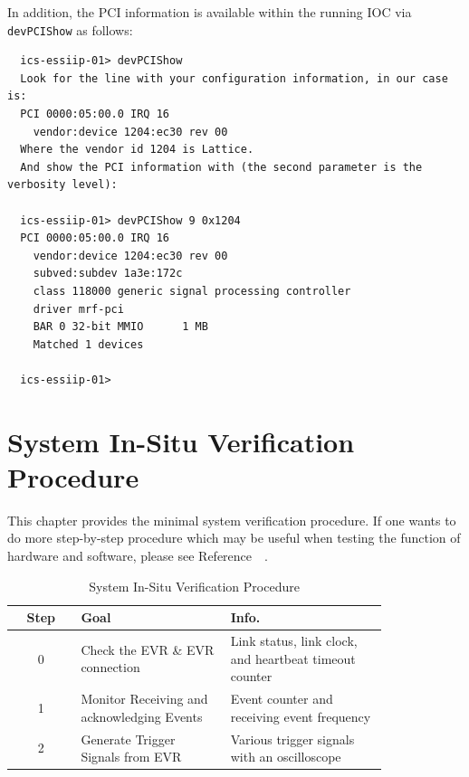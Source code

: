 \documentclass[11pt
  , a4paper
  , article
  , oneside
  , showtrims
]{memoir}
\begin{document}
In addition, the PCI information is available within the running IOC via \texttt{devPCIShow} as follows:
\begin{lstlisting}
  ics-essiip-01> devPCIShow
  Look for the line with your configuration information, in our case is:
  PCI 0000:05:00.0 IRQ 16
    vendor:device 1204:ec30 rev 00
  Where the vendor id 1204 is Lattice.
  And show the PCI information with (the second parameter is the verbosity level):

  ics-essiip-01> devPCIShow 9 0x1204
  PCI 0000:05:00.0 IRQ 16
    vendor:device 1204:ec30 rev 00
    subved:subdev 1a3e:172c
    class 118000 generic signal processing controller
    driver mrf-pci
    BAR 0 32-bit MMIO      1 MB
    Matched 1 devices

  ics-essiip-01>
\end{lstlisting}

\newpage
\chapter{System In-Situ Verification Procedure}
This chapter provides the minimal system verification procedure. If one wants to do more step-by-step procedure which may be useful when testing the function of hardware and software, please see Reference~~\citep[see][p14]{EVR-USER-GUIDE}.

\begin{table}[!htb]
  \centering
  \begin{tabular}{c|p{0.4\linewidth}|p{0.42\linewidth}}
    \toprule
    Step & Goal                                       & Info.                                                  \\\midrule
    0    & Check the EVR \& EVR connection            & Link status, link clock, and heartbeat timeout counter \\\midrule
    1    & Monitor Receiving and acknowledging Events & Event counter and receiving event frequency            \\\midrule
    2    & Generate Trigger Signals from EVR          & Various trigger signals with an oscilloscope           \\\bottomrule
  \end{tabular}
  \caption[]{System In-Situ Verification Procedure}
  \label{table:checklist}
\end{table}
\end{document}
